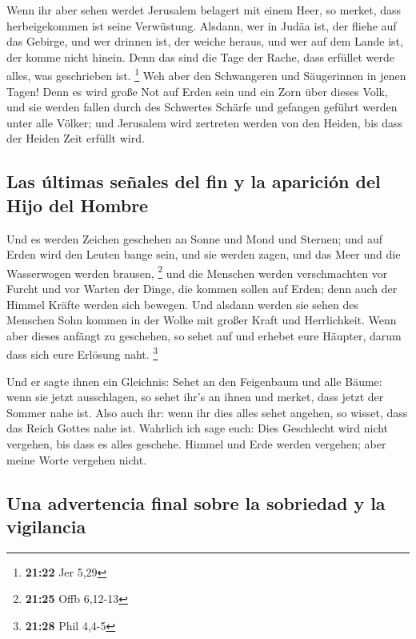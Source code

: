  Wenn ihr aber sehen werdet Jerusalem belagert mit einem
Heer, so merket, dass herbeigekommen ist seine Verwüstung.
 Alsdann, wer in Judäa ist, der fliehe auf das Gebirge,
und wer drinnen ist, der weiche heraus, und wer auf dem Lande ist, der
komme nicht hinein.  Denn das sind die Tage der Rache,
dass erfüllet werde alles, was geschrieben ist. \footnote{\textbf{21:22}
  Jer 5,29}  Weh aber den Schwangeren und Säugerinnen in
jenen Tagen! Denn es wird große Not auf Erden sein und ein Zorn über
dieses Volk,  und sie werden fallen durch des Schwertes
Schärfe und gefangen geführt werden unter alle Völker; und Jerusalem
wird zertreten werden von den Heiden, bis dass der Heiden Zeit erfüllt
wird.

\hypertarget{las-uxfaltimas-seuxf1ales-del-fin-y-la-apariciuxf3n-del-hijo-del-hombre}{%
\subsection{Las últimas señales del fin y la aparición del Hijo del
Hombre}\label{las-uxfaltimas-seuxf1ales-del-fin-y-la-apariciuxf3n-del-hijo-del-hombre}}

 Und es werden Zeichen geschehen an Sonne und Mond und
Sternen; und auf Erden wird den Leuten bange sein, und sie werden zagen,
und das Meer und die Wasserwogen werden brausen, \footnote{\textbf{21:25}
  Offb 6,12-13}  und die Menschen werden verschmachten
vor Furcht und vor Warten der Dinge, die kommen sollen auf Erden; denn
auch der Himmel Kräfte werden sich bewegen.  Und alsdann
werden sie sehen des Menschen Sohn kommen in der Wolke mit großer Kraft
und Herrlichkeit.  Wenn aber dieses anfängt zu geschehen,
so sehet auf und erhebet eure Häupter, darum dass sich eure Erlösung
naht. \footnote{\textbf{21:28} Phil 4,4-5}

 Und er sagte ihnen ein Gleichnis: Sehet an den
Feigenbaum und alle Bäume:  wenn sie jetzt ausschlagen,
so sehet ihr's an ihnen und merket, dass jetzt der Sommer nahe ist.
 Also auch ihr: wenn ihr dies alles sehet angehen, so
wisset, dass das Reich Gottes nahe ist.  Wahrlich ich
sage euch: Dies Geschlecht wird nicht vergehen, bis dass es alles
geschehe.  Himmel und Erde werden vergehen; aber meine
Worte vergehen nicht.

\hypertarget{una-advertencia-final-sobre-la-sobriedad-y-la-vigilancia}{%
\subsection{Una advertencia final sobre la sobriedad y la
vigilancia}\label{una-advertencia-final-sobre-la-sobriedad-y-la-vigilancia}}

